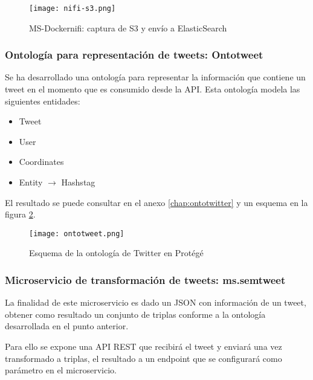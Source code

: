 \begin{figure}[!h]
  \begin{center}
    \texttt{[image: nifi-s3.png]} 
    \caption{MS-Dockernifi: captura de S3 y envío a ElasticSearch}
    \label{fig:nifi-s3}
  \end{center}
\end{figure}


\subsubsection{Ontología para representación de tweets: Ontotweet}

Se ha desarrollado una ontología para representar la información que contiene un
tweet en el momento que es consumido desde la \acs{API}. Esta ontología modela
las siguientes entidades: 

\begin{itemize}
\item Tweet
\item User
\item Coordinates
\item Entity $\to$ Hashstag
\end{itemize}

El resultado se puede consultar en el anexo \ref{chap:ontotwitter} y un esquema
en la figura \ref{fig:ontotwitterprotege}.

\begin{figure}[!h]
  \begin{center}
    \texttt{[image: ontotweet.png]} 
    \caption{Esquema de la ontología de Twitter en Protégé}
    \label{fig:ontotwitterprotege}
  \end{center}
\end{figure}

\subsubsection{Microservicio de transformación de tweets: ms.semtweet}

La finalidad de este microservicio es dado un \acs{JSON} con información de un
tweet, obtener como resultado un conjunto de triplas conforme a la ontología
desarrollada en el punto anterior.

Para ello se expone una \acs{API} \acs{REST} que recibirá el tweet y enviará una
vez transformado a triplas, el resultado a un endpoint que se configurará como
parámetro en el microservicio. 

